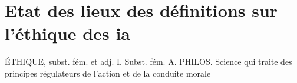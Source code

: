 \section{Etat des lieux des définitions sur l'éthique des \gls{ia}}


ÉTHIQUE, subst. fém. et adj.
I. Subst. fém.
A. PHILOS. Science qui traite des principes régulateurs de l'action et de la conduite morale


\pagebreak
